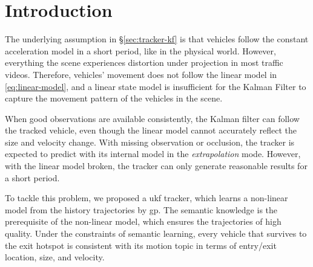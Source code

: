 \section{Introduction}
\label{sec:gp-ukf-intro}

The underlying assumption in \S\ref{sec:tracker-kf} is that vehicles follow the constant acceleration model in a short period, like in the physical world.
However, everything the scene experiences distortion under projection in most traffic videos. Therefore, vehicles' movement does not follow the linear model in \ref{eq:linear-model}, and a linear state model is insufficient for the Kalman Filter to capture the movement pattern of the vehicles in the scene.

When good observations are available consistently, the Kalman filter can follow the tracked vehicle, even though the linear model cannot accurately reflect the size and velocity change. 
With missing observation or occlusion, the tracker is expected to predict with its internal model in the \emph{extrapolation} mode. 
However, with the linear model broken, the tracker can only generate reasonable results for a short period.

To tackle this problem, we proposed a \gls{ukf} tracker, which learns a non-linear model from the history trajectories by \gls{gp}. 
The semantic knowledge is the prerequisite of the non-linear model, which ensures the trajectories of high quality.
Under the constraints of semantic learning, every vehicle that survives to the exit hotspot is consistent with its motion topic in terms of entry/exit location, size, and velocity.

